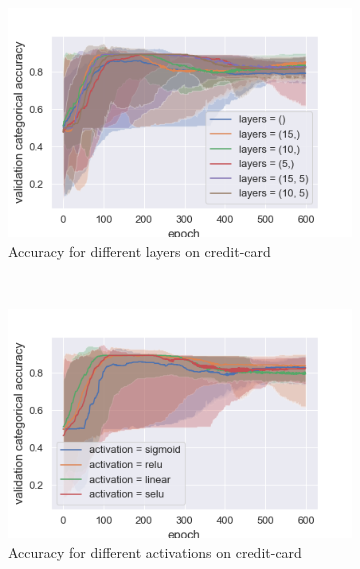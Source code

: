 \documentclass[10pt]{article}
\begin{document}
		\begin{figure}
			\centering
			\begin{subfigure}[]{0.45\columnwidth}
				\centering
				\includegraphics[width=\linewidth]{../graphics/per_creditcard_epoch_score_type_layers.png}
				\caption{Accuracy for different layers on credit-card}
				\label{per_cc_layers}
			\end{subfigure}~
			\begin{subfigure}[]{0.45\columnwidth}
				\centering
				\includegraphics[width=\linewidth]{../graphics/per_creditcard_epoch_score_type_activation.png}
				\caption{Accuracy for different activations on credit-card}
				\label{per_cc_act}
			\end{subfigure}
			\begin{subfigure}[]{0.45\columnwidth}
				\centering

\end{subfigure}
\end{figure}
\end{document}
